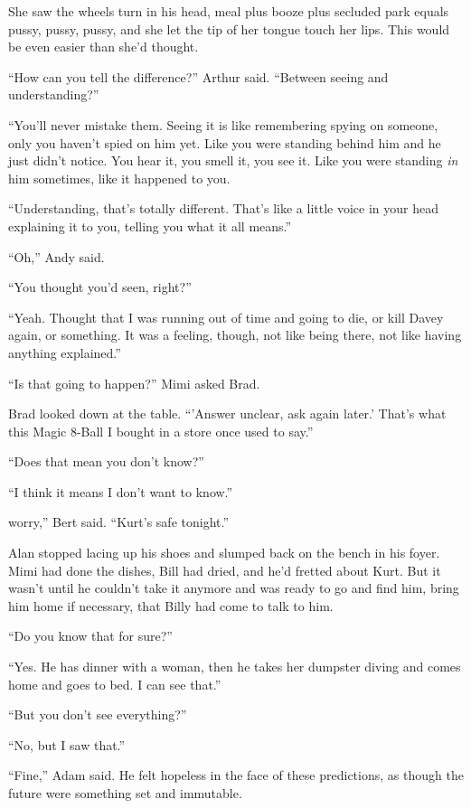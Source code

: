 She saw the wheels turn in his head, meal plus booze plus secluded
park equals pussy, pussy, pussy, and she let the tip of her tongue
touch her lips.  This would be even easier than she'd thought.

``How can you tell the difference?'' Arthur said.  ``Between seeing
and understanding?''

``You'll never mistake them.  Seeing it is like remembering spying on
someone, only you haven't spied on him yet.  Like you were standing
behind him and he just didn't notice.  You hear it, you smell it, you
see it.  Like you were standing \textit{in} him sometimes, like it
happened to you.

``Understanding, that's totally different.  That's like a little voice
in your head explaining it to you, telling you what it all means.''

``Oh,'' Andy said.

``You thought you'd seen, right?''

``Yeah.  Thought that I was running out of time and going to die, or
kill Davey again, or something.  It was a feeling, though, not like
being there, not like having anything explained.''

``Is that going to happen?'' Mimi asked Brad.

Brad looked down at the table.  ``'Answer unclear, ask again later.'
That's what this Magic 8-Ball I bought in a store once used to say.''

``Does that mean you don't know?''

``I think it means I don't want to know.''

worry,'' Bert said.  ``Kurt's safe tonight.''

Alan stopped lacing up his shoes and slumped back on the bench in his
foyer.  Mimi had done the dishes, Bill had dried, and he'd fretted
about Kurt.  But it wasn't until he couldn't take it anymore and was
ready to go and find him, bring him home if necessary, that Billy had
come to talk to him.

``Do you know that for sure?''

``Yes.  He has dinner with a woman, then he takes her dumpster diving
and comes home and goes to bed.  I can see that.''

``But you don't see everything?''

``No, but I saw that.''

``Fine,'' Adam said.  He felt hopeless in the face of these
predictions, as though the future were something set and immutable.

